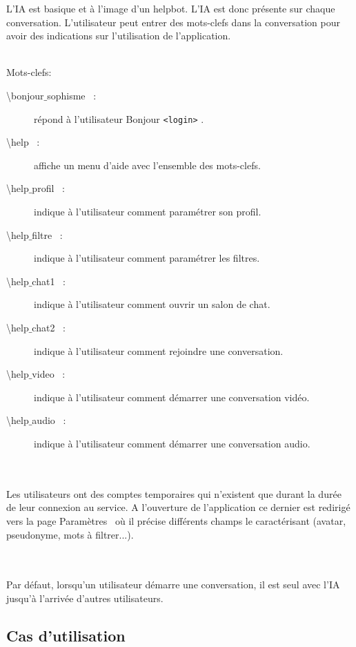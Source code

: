 \documentclass[11pt,dvipsnames,svgnames]{report}
\begin{document}
\begin{mdframed}[topline=false,rightline=false,bottomline=false, linewidth=3pt,linecolor=red]
L'IA est basique et à l'image d'un helpbot. L'IA est donc présente sur chaque conversation. L'utilisateur peut entrer des mots-clefs dans la conversation pour avoir des indications sur l'utilisation de l'application.

~\\
Mots-clefs:
\begin{description}
\item[\og \textbackslash bonjour$\_$sophisme \fg\ :] répond à l'utilisateur \og Bonjour \texttt{<login>} \fg.
\item[\og \textbackslash help \fg\ :] affiche un menu d'aide avec l'ensemble des mots-clefs.
\item[\og \textbackslash help$\_$profil \fg\ :] indique à l'utilisateur comment paramétrer son profil.
\item[\og \textbackslash help$\_$filtre \fg\ :] indique à l'utilisateur comment paramétrer les filtres.
\item[\og \textbackslash help$\_$chat1 \fg\ :] indique à l'utilisateur comment ouvrir un salon de chat.
\item[\og \textbackslash help$\_$chat2 \fg\ :] indique à l'utilisateur comment rejoindre une conversation.
\item[\og \textbackslash help$\_$video \fg\ :] indique à l'utilisateur comment démarrer une conversation vidéo.
\item[\og \textbackslash help$\_$audio \fg\ :] indique à l'utilisateur comment démarrer une conversation audio.
\end{description}

~\\\\

Les utilisateurs ont des comptes temporaires qui n'existent que durant la durée de leur connexion au service. A l'ouverture de l'application ce dernier est redirigé vers la page \og Paramètres \fg\ où il précise différents champs le caractérisant (avatar, pseudonyme, mots à filtrer...).

~\\\\
Par défaut, lorsqu'un utilisateur démarre une conversation, il est seul avec l'IA jusqu'à l'arrivée d'autres utilisateurs.
\end{mdframed}
\subsection*{Cas d'utilisation}
\end{document}
